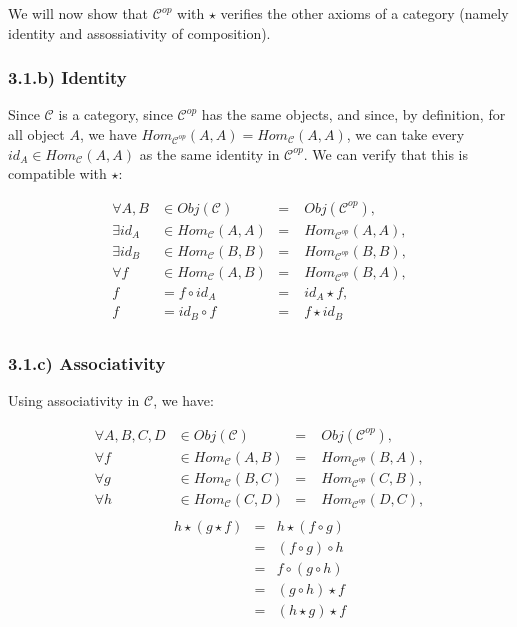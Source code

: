 \documentclass[12pt, letterpaper, twoside]{report}
\begin{document}
We will now show that $\mathcal{C}^{op}$ with $\star$ verifies the other axioms of a category (namely identity and assossiativity of composition).

\subsubsection*{3.1.b) Identity}

Since $\mathcal{C}$ is a category, since $\mathcal{C}^{op}$ has the same objects, and since, by definition, for all object $A$, we have $Hom_{\mathcal{C}^{op}} (A, A) = Hom_{\mathcal{C}} (A, A)$, we can take every $id_A \in Hom_{\mathcal{C}}(A, A)$ as the same identity in $\mathcal{C}^{op}$. We can verify that this is compatible with $\star$:

$$
\begin{aligned}
	\forall A, B & \in Obj (\mathcal{C})        &=& \;  Obj (\mathcal{C}^{op})        , \\
	\exists id_A & \in Hom_{\mathcal{C}} (A, A) &=& \;  Hom_{\mathcal{C}^{op}} (A, A) , \\
	\exists id_B & \in Hom_{\mathcal{C}} (B, B) &=& \;  Hom_{\mathcal{C}^{op}} (B, B) , \\
	\forall f    & \in Hom_{\mathcal{C}} (A, B) &=& \;  Hom_{\mathcal{C}^{op}} (B, A) , \\
	f            & =   f    \circ id_A          &=& \;  id_A \star f                  , \\
	f            & =   id_B \circ    f          &=& \;  f    \star id_B                 \\
\end{aligned}
$$

\subsubsection*{3.1.c) Associativity}

Using associativity in $\mathcal{C}$, we have:

$$
\begin{aligned}
	\forall A, B, C, D & \in Obj (\mathcal{C})        &=& \;  Obj (\mathcal{C}^{op})        , \\
	\forall f          & \in Hom_{\mathcal{C}} (A, B) &=& \;  Hom_{\mathcal{C}^{op}} (B, A) , \\
	\forall g          & \in Hom_{\mathcal{C}} (B, C) &=& \;  Hom_{\mathcal{C}^{op}} (C, B) , \\
	\forall h          & \in Hom_{\mathcal{C}} (C, D) &=& \;  Hom_{\mathcal{C}^{op}} (D, C) , \\
\end{aligned}
$$
$$
\begin{aligned}
	h \star (g \star f) &=&  h \star (f  \circ g) \\
						&=& (f \circ  g) \circ h  \\
						&=&  f \circ  (g \circ h) \\
						&=&  (g \circ h) \star f  \\
						&=&  (h \star g) \star f  \\
\end{aligned}
$$
\end{document}
